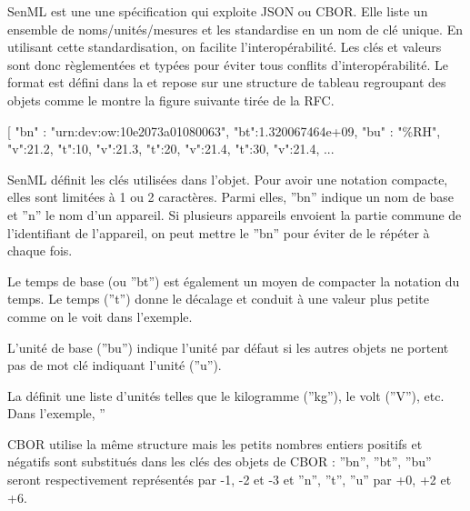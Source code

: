 \ac{SenML} est une une spécification qui exploite JSON ou CBOR. Elle liste un ensemble de noms/unités/mesures et les standardise en un nom de clé unique. En utilisant cette standardisation, on facilite l'interopérabilité. Les clés et valeurs sont donc règlementées et typées pour éviter tous conflits d'interopérabilité. Le format est défini dans la  et repose sur une structure de tableau regroupant des objets comme le montre la figure suivante tirée de la RFC.

\begin{termc}[backgroundcolor=\color{palerod}, language=json, basicstyle=\ttfamily\small, escapechar=@]
[
 {"bn" : "urn:dev:ow:10e2073a01080063", "bt":1.320067464e+09,
  "bu" : "\%RH", "v":21.2},
 {"t":10, "v":21.3},
 {"t":20, "v":21.4},
 {"t":30, "v":21.4},
...
\end{termc}

SenML définit les clés utilisées dans l’objet. Pour avoir une notation compacte, elles sont limitées à 1 ou 2 caractères. Parmi elles, ”bn” indique un nom de base et ”n” le nom d’un appareil. Si plusieurs appareils envoient la partie commune de l’identifiant de l’appareil, on peut mettre le ”bn” pour éviter de le répéter à chaque fois.

Le temps de base (ou ”bt”) est également un moyen de compacter la notation du temps. Le temps (”t”) donne le décalage et conduit à une valeur plus petite comme on le voit dans l’exemple.

L’unité de base (”bu”) indique l’unité par défaut si les autres objets ne portent pas de mot clé indiquant l’unité (”u”).

La  définit une liste d’unités telles que le kilogramme (”kg”), le volt (”V”), etc. Dans l’exemple, ”%

CBOR utilise la même structure mais les petits nombres entiers positifs et négatifs sont substitués dans les clés des objets de CBOR : ”bn”, ”bt”, ”bu” seront respectivement représentés par -1, -2 et -3 et ”n”, ”t”, ”u” par +0, +2 et +6.



